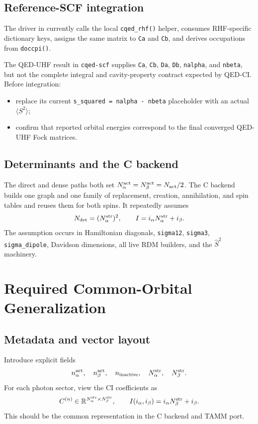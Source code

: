\documentclass[11pt]{article}
\newcommand{\code}[1]{\texttt{\small #1}}
\begin{document}
\subsection{Reference-SCF integration}

The driver in  currently calls the local
\code{cqed\_rhf()} helper, consumes RHF-specific dictionary keys, assigns the
same matrix to \code{Ca} and \code{Cb}, and derives occupations from
\code{doccpi()}.

The QED-UHF result in \code{cqed-scf} supplies \code{Ca}, \code{Cb},
\code{Da}, \code{Db}, \code{nalpha}, and \code{nbeta}, but not the complete
integral and cavity-property contract expected by QED-CI. Before integration:
\begin{itemize}
  \item replace its current \code{s\_squared = nalpha - nbeta} placeholder
  with an actual \(\langle S^2\rangle\);
  \item confirm that reported orbital energies correspond to the final
  converged QED-UHF Fock matrices.
\end{itemize}

\subsection{Determinants and the C backend}

The direct and dense paths both set
\(N_\alpha^{\rm act}=N_\beta^{\rm act}=N_{\rm act}/2\). The C backend builds
one graph and one family of replacement, creation, annihilation, and spin tables
and reuses them for both spins. It repeatedly assumes
\[
N_{\rm det}=(N_\alpha^{\rm str})^2,\qquad
I=i_\alpha N_\alpha^{\rm str}+i_\beta.
\]
The assumption occurs in Hamiltonian diagonals, \code{sigma12},
\code{sigma3}, \code{sigma\_dipole}, Davidson dimensions, all live RDM
builders, and the \(\hat S^2\) machinery.

\section{Required Common-Orbital Generalization}

\subsection{Metadata and vector layout}

Introduce explicit fields
\[
n_\alpha^{\rm act},\quad n_\beta^{\rm act},\quad n_{\rm inactive},
\quad N_\alpha^{\rm str},\quad N_\beta^{\rm str}.
\]
For each photon sector, view the CI coefficients as
\[
C^{(n)}\in\mathbb R^{N_\alpha^{\rm str}\times N_\beta^{\rm str}},
\qquad I(i_\alpha,i_\beta)=i_\alpha N_\beta^{\rm str}+i_\beta.
\]
This should be the common representation in the C backend and TAMM port.
\end{document}
